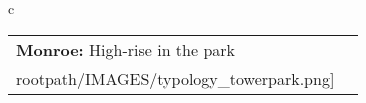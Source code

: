 \begin{table}[H]
        \begin{tabular}{c}
        \begin{tabular}{m{1.5in} m{2in}}
\textbf{Monroe:} {High-rise in the park} & \texttt{[image: \\rootpath/IMAGES/typology\_towerpark.png]}
\end{tabular}\end{tabular}
        \end{table}